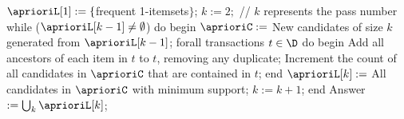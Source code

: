 $\aprioriL[1] := \{$frequent 1-itemsets$\}$;
$k:=2;$  // $k$ represents the pass number
while ($\aprioriL[k-1] \neq \emptyset$) do begin
	$\aprioriC := $ New candidates of size $k$ generated from $\aprioriL[k-1]$;
	forall transactions $t \in \D$ do begin
		Add all ancestors of each item in $t$ to $t$, removing any duplicate;
		Increment the count of all candidates in $\aprioriC$ that are contained in $t$;
  end
	$\aprioriL[k] := $ All candidates in $\aprioriC$ with minimum support;
	$k := k+1$;
end
Answer $:=\bigcup_k{\aprioriL[k]}$;
